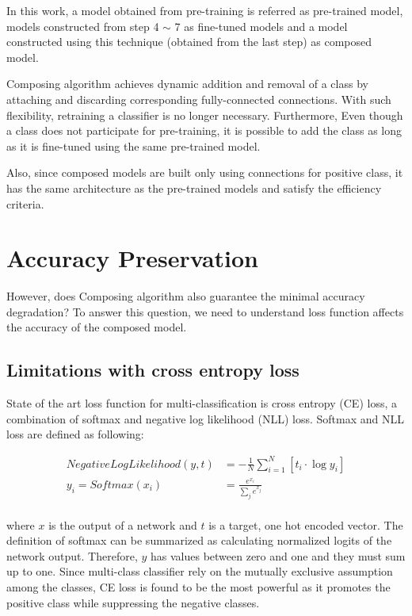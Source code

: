 \documentclass{article}
\begin{document}
In this work, a model obtained from pre-training is referred as pre-trained model, models constructed from step 4 $\sim$ 7 as fine-tuned models and a model constructed using this technique (obtained from the last step) as composed model.

Composing algorithm achieves dynamic addition and removal of a class by attaching and discarding corresponding fully-connected connections. With such flexibility, retraining a classifier is no longer necessary. Furthermore, Even though a class does not participate for pre-training, it is possible to add the class as long as it is fine-tuned using the same pre-trained model.

Also, since composed models are built only using connections for positive class, it has the same architecture as the pre-trained models and satisfy the efficiency criteria.

\section{Accuracy Preservation}

However, does Composing algorithm also guarantee the minimal accuracy degradation? To answer this question, we need to understand loss function affects the accuracy of the composed model.

\subsection{Limitations with cross entropy loss}

State of the art loss function for multi-classification is cross entropy (CE) loss, a combination of softmax and negative log likelihood (NLL) loss. Softmax and NLL loss are defined as following:

\begin{align*}
NegativeLogLikelihood(y, t) & = -\frac{1}{N}\sum_{i=1}^N \left[ t_i \cdot \log y_i\right] \\
y_i = Softmax(x_i) &= \frac{e^{x_i}}{\sum_{j}e^{x_j}} \\
\end{align*}

where $x$ is the output of a network and $t$ is a target, one hot encoded vector. The definition of softmax can be summarized as calculating normalized logits of the network output. Therefore, $y$ has values between zero and one and they must sum up to one. Since multi-class classifier rely on the mutually exclusive assumption among the classes, CE loss is found to be the most powerful as it promotes the positive class while suppressing the negative classes.
\end{document}
